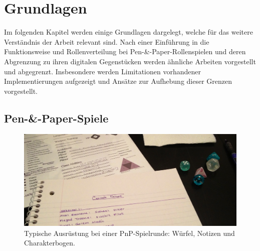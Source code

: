 \chapter{Grundlagen}
\label{background}

Im folgenden Kapitel werden einige Grundlagen dargelegt, welche für das weitere Verständnis der Arbeit relevant sind. Nach einer Einführung in die Funktionsweise und Rollenverteilung bei Pen-\&-Paper-Rollenspielen und deren Abgrenzung zu ihren digitalen Gegenstücken werden ähnliche Arbeiten vorgestellt und abgegrenzt. Insbesondere werden Limitationen vorhandener Implementierungen aufgezeigt und Ansätze zur Aufhebung dieser Grenzen vorgestellt.




\section{Pen-\&-Paper-Spiele}
\label{sec:PenPaperSpiele}


\begin{figure}[hbtp]
	\centering
		\includegraphics[width=1.00\textwidth]{media/pnp_supplies.png}
	\caption [Typische Ausrüstung bei einer Pen-\&-Paper-Spielrunde: Würfel, Notizen und Charakterbogen.]{Typische Ausrüstung bei einer PnP-Spielrunde: Würfel, Notizen und Charakterbogen.\protect\footnotemark[1]}
	\label{fig:pnp_supplies}
\end{figure}


